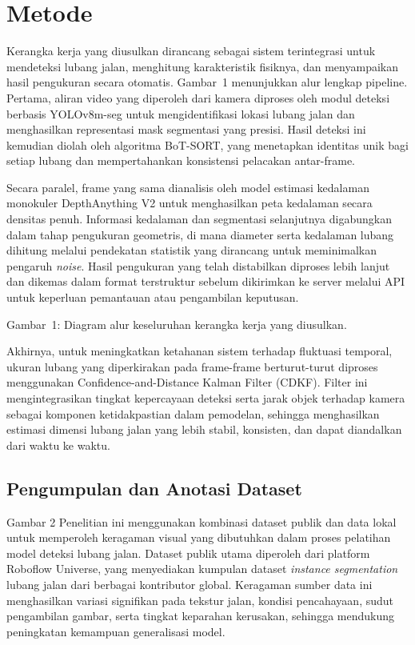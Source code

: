 \documentclass{iopjournal}
\begin{document}
\section{Metode}

Kerangka kerja yang diusulkan dirancang sebagai sistem terintegrasi untuk mendeteksi lubang jalan, menghitung karakteristik fisiknya, dan menyampaikan hasil pengukuran secara otomatis. Gambar~1 menunjukkan alur lengkap pipeline. Pertama, aliran video yang diperoleh dari kamera diproses oleh modul deteksi berbasis YOLOv8m-seg untuk mengidentifikasi lokasi lubang jalan dan menghasilkan representasi mask segmentasi yang presisi. Hasil deteksi ini kemudian diolah oleh algoritma BoT-SORT, yang menetapkan identitas unik bagi setiap lubang dan mempertahankan konsistensi pelacakan antar-frame.

Secara paralel, frame yang sama dianalisis oleh model estimasi kedalaman monokuler DepthAnything V2 untuk menghasilkan peta kedalaman secara densitas penuh. Informasi kedalaman dan segmentasi selanjutnya digabungkan dalam tahap pengukuran geometris, di mana diameter serta kedalaman lubang dihitung melalui pendekatan statistik yang dirancang untuk meminimalkan pengaruh \textit{noise}. Hasil pengukuran yang telah distabilkan diproses lebih lanjut dan dikemas dalam format terstruktur sebelum dikirimkan ke server melalui API untuk keperluan pemantauan atau pengambilan keputusan.

Gambar~1: Diagram alur keseluruhan kerangka kerja yang diusulkan.

Akhirnya, untuk meningkatkan ketahanan sistem terhadap fluktuasi temporal, ukuran lubang yang diperkirakan pada frame-frame berturut-turut diproses menggunakan Confidence-and-Distance Kalman Filter (CDKF). Filter ini mengintegrasikan tingkat kepercayaan deteksi serta jarak objek terhadap kamera sebagai komponen ketidakpastian dalam pemodelan, sehingga menghasilkan estimasi dimensi lubang jalan yang lebih stabil, konsisten, dan dapat diandalkan dari waktu ke waktu.


\subsection{Pengumpulan dan Anotasi Dataset}

Gambar 2
Penelitian ini menggunakan kombinasi dataset publik dan data lokal untuk memperoleh keragaman visual yang dibutuhkan dalam proses pelatihan model deteksi lubang jalan. Dataset publik utama diperoleh dari platform Roboflow Universe, yang menyediakan kumpulan dataset \textit{instance segmentation} lubang jalan dari berbagai kontributor global. Keragaman sumber data ini menghasilkan variasi signifikan pada tekstur jalan, kondisi pencahayaan, sudut pengambilan gambar, serta tingkat keparahan kerusakan, sehingga mendukung peningkatan kemampuan generalisasi model.
\end{document}
